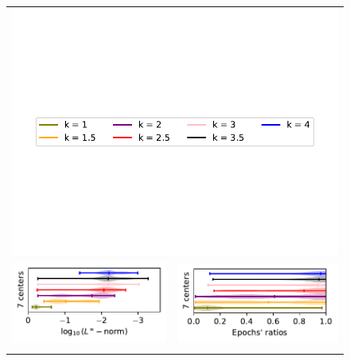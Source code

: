 \documentclass[12pt]{report} %
\begin{document}
\begin{figure}[H]
  \begin{tabular}{rl}
    \multicolumn{2}{c}{{\includegraphics[width=.7\textwidth, trim={0.5cm 4cm .5cm 3.8cm},clip=true]
          {imagenes/experiments/1d/statistical_1d_full/runge_function/runge_function_legend.pdf}}} \\ 
    {\includegraphics[width=.5\textwidth, trim={0 1.25cm 0 0},clip=true]
    {imagenes/experiments/1d/statistical_1d_full/sin_higher_oscillations/linf_sin_higher_oscillations_C7_gaussian_kernel.pdf}}  & 
    {\includegraphics[width=.44\textwidth, trim={.7cm 1.15cm 0 0},clip=true]
    {imagenes/experiments/1d/statistical_1d_full/sin_higher_oscillations/epochs_sin_higher_oscillations_C7_gaussian_kernel.pdf}}                                                                                      \\
    {\includegraphics[width=.5\textwidth, trim={0 1.25cm 0 0},clip=true]
}
\end{tabular}
\end{figure}
\end{document}
